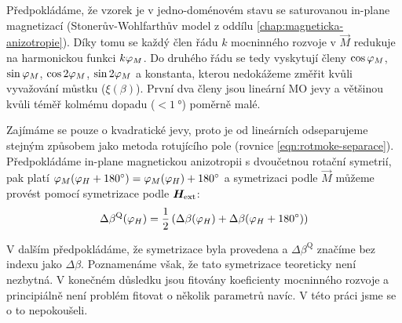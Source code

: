 Předpokládáme, že vzorek je v jedno-doménovém stavu se saturovanou in-plane magnetizací (Stonerův-Wohlfarthův model z oddílu \ref{chap:magneticka-anizotropie}).
Díky tomu se každý člen řádu $k$ mocninného rozvoje v $\vec{M}$ redukuje na harmonickou funkci $k\varphi_M$.
Do druhého řádu se tedy vyskytují členy $\cos\varphi_M$, $\sin\varphi_M$, $\cos2\varphi_M$, $\sin2\varphi_M$ a konstanta, kterou nedokážeme změřit kvůli vyvažování můstku ($\xi(\beta)$).
První dva členy jsou lineární MO jevy a většinou kvůli téměř kolmému dopadu ($< \SI{1}{\degree}$) poměrně malé.

Zajímáme se pouze o kvadratické jevy, proto je od lineárních odseparujeme stejným způsobem jako metoda rotujícího pole (rovnice \eqref{eqn:rotmoke-separace}).
Předpokládáme in-plane magnetickou anizotropii s dvoučetnou rotační symetrií, pak platí $\varphi_M(\varphi_H+\SI{180}{\degree})=\varphi_M(\varphi_H)+\SI{180}{\degree}$ a symetrizaci podle $\vec{M}$ můžeme provést pomocí symetrizace podle $\bm{H}_\textrm{ext}$:
\begin{equation}
    \label{eqn:symetrizace-H}
    \Delta\beta^\textrm{Q}(\varphi_H) = \frac{1}{2}\left(\Delta\beta(\varphi_H) + \Delta\beta(\varphi_H+\SI{180}{\degree})\right)
\end{equation}

V dalším předpokládáme, že symetrizace byla provedena a $\Delta\beta^\textrm{Q}$ značíme bez indexu jako $\Delta\beta$.
Poznamenáme však, že tato symetrizace teoreticky není nezbytná.
V konečném důsledku jsou fitovány koeficienty mocninného rozvoje a principiálně není problém fitovat o několik parametrů navíc.
V této práci jsme se o to nepokoušeli.

